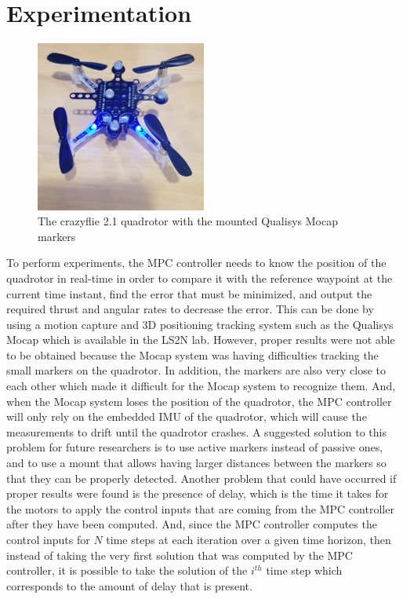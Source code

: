 \documentclass{thesisreport}
\begin{document}
\newpage 
 
 	\section{Experimentation}


\begin{figure}[h]
	\centering
	\includegraphics[width=0.5\textwidth, angle=-90]{Images/crazyflie/experimentation.jpg}
	\caption{The crazyflie 2.1 quadrotor with the mounted Qualisys Mocap markers}
	\label{fig:crazyflie_expermientation}
\end{figure}

To perform experiments, the MPC controller needs to know the position of the quadrotor in real-time in order to compare it with the reference waypoint at the current time instant, find the error that must be minimized, and output the required thrust and angular rates to decrease the error. This can be done by using a motion capture and 3D positioning tracking system such as the Qualisys Mocap which is available in the LS2N lab. However, proper results were not able to be obtained because the Mocap system was having difficulties tracking the small markers on the quadrotor. In addition, the markers are also very close to each other which made it difficult for the Mocap system to recognize them. And, when the Mocap system loses the position of the quadrotor, the MPC controller will only rely on the embedded IMU of the quadrotor, which will cause the measurements to drift until the quadrotor crashes. A suggested solution to this problem for future researchers is to use active markers instead of passive ones, and to use a mount that allows having larger distances between the markers so that they can be properly detected. Another problem that could have occurred if proper results were found is the presence of delay, which is the time it takes for the motors to apply the control inputs that are coming from the MPC controller after they have been computed. And, since the MPC controller computes the control inputs for $N$ time steps at each iteration over a given time horizon, then instead of taking the very first solution that was computed by the MPC controller, it is possible to take the solution of the $i^{th}$ time step which corresponds to the amount of delay that is present.
\end{document}

